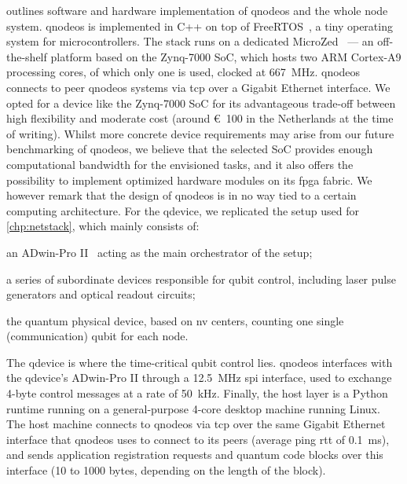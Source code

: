  outlines software and hardware implementation of \acrshort{qnodeos} and
the whole node system. \acrshort{qnodeos} is implemented in C++ on top of FreeRTOS~\cite{freertos},
a tiny operating system for microcontrollers. The stack runs on a dedicated MicroZed~\cite{microzed}
--- an off-the-shelf platform based on the Zynq-7000 SoC, which hosts two ARM Cortex-A9 processing
cores, of which only one is used, clocked at \qty{667}{\MHz}. \acrshort{qnodeos} connects to peer
\acrshort{qnodeos} systems via \acrshort{tcp} over a Gigabit Ethernet interface. We opted for a
device like the Zynq-7000 SoC for its advantageous trade-off between high flexibility and moderate
cost (around €~100 in the Netherlands at the time of writing). Whilst more concrete device
requirements may arise from our future benchmarking of \acrshort{qnodeos}, we believe that the
selected SoC provides enough computational bandwidth for the envisioned tasks, and it also offers
the possibility to implement optimized hardware modules on its \acrshort{fpga} fabric. We however
remark that the design of \acrshort{qnodeos} is in no way tied to a certain computing architecture.
For the \acrshort{qdevice}, we replicated the setup used for \cref{chp:netstack}, which mainly
consists of:
%
\begin{inlinelist}
    \item an ADwin-Pro II~\cite{adwin} acting as the main orchestrator of the setup;
    \item a series of subordinate devices responsible for qubit control, including laser pulse
          generators and optical readout circuits;
    \item the quantum physical device, based on \acrshort{nv} centers, counting one single
          (communication) qubit for each node.
\end{inlinelist}
The \acrshort{qdevice} is where the time-critical qubit control lies. \acrshort{qnodeos} interfaces
with the \acrshort{qdevice}'s ADwin-Pro II through a \qty{12.5}{\MHz} \acrshort{spi} interface, used
to exchange 4-byte control messages at a rate of \qty{50}{kHz}. Finally, the host layer is a Python
runtime running on a general-purpose 4-core desktop machine running Linux. The host machine connects
to \acrshort{qnodeos} via \acrshort{tcp} over the same Gigabit Ethernet interface that
\acrshort{qnodeos} uses to connect to its peers (average ping \acrshort{rtt} of \qty{0.1}{\ms}), and
sends application registration requests and quantum code blocks over this interface (\num{10} to
\num{1000} bytes, depending on the length of the block).

